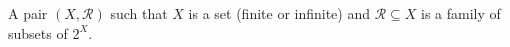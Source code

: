 \begin{definition}[%
	name={Range Space}%
]
A pair \((X, \mathcal{R})\) such that \(X\) is a set (finite or infinite) and
\(\mathcal{R} \subseteq X\) is a family of subsets of \(2^X\).
\end{definition}
